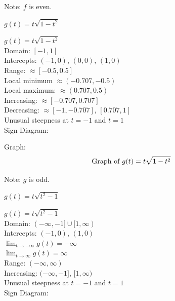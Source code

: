 \documentclass{ximera}
\begin{document}
\begin{question}
\begin {problem}
\begin{solution}
Note:  $f$ is even.
\end{solution}

\end {problem}

\begin {problem}
$g(t) = t \sqrt{1-t^2}$
\begin{solution}
$g(t) = t\sqrt{1-t^2}$\\
Domain: $[-1,1]$\\
Intercepts: $(-1,0)$, $(0,0)$, $(1,0)$\\
Range:  $\approx [-0.5, 0.5]$\\
Local minimum $\approx (-0.707, -0.5)$ \\
Local maximum:  $\approx (0.707, 0.5)$\\
Increasing: $\approx [-0.707, 0.707]$ \\
Decreasing:  $\approx [-1, -0.707]$, $[0.707, 1]$\\
Unusual steepness at $t = -1$ and $t = 1$\\
Sign Diagram:\\

% 

Graph:\\

$$\text{Graph of $g(t) = t \sqrt{1-t^2}$}$$

Note:  $g$ is odd.
\end{solution}

\end {problem}

\begin {problem}
$g(t) = t \sqrt{t^2-1}$

\begin{solution}
$g(t) = t\sqrt{t^2-1}$\\
Domain: $(-\infty, -1] \cup [1,\infty)$\\
Intercepts: $(-1,0)$, $(1,0)$\\
$ \lim_{t \rightarrow -\infty} g(t) = -\infty$ \\
$ \lim_{t \rightarrow \infty} g(t) = \infty$ \\
Range: $(-\infty, \infty)$\\
Increasing: $(-\infty, -1]$, $[1, \infty)$\\
Unusual steepness at $t = -1$ and $t = 1$\\
Sign Diagram:\\


\end{solution}
\end{problem}
\end{question}
\end{document}

